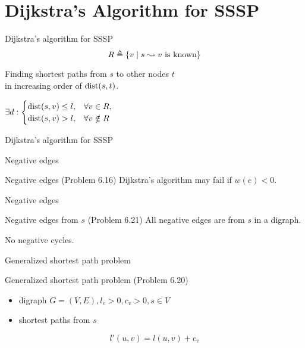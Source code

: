 \section{Dijkstra's Algorithm for SSSP}

\begin{frame}{Dijkstra's algorithm for SSSP}
  \[
	R \triangleq \{v \mid s \leadsto v \text{ is known}\}
  \]

  \vspace{0.50cm}
  \begin{center}
	Finding shortest paths from $s$ to other nodes $t$ \\
	in increasing order of $\text{dist}(s,t)$.
  \end{center}

  \begin{theorem}[Invariant]
	$\begin{displaystyle}
	  \exists d: \begin{cases}
		\dist(s,v) \le l, 	& \forall v \in R, \\
		\dist(s,v) > l, 	& \forall v \notin R
	  \end{cases}
	\end{displaystyle}$
  \end{theorem}
\end{frame}
\begin{frame}{Dijkstra's algorithm for SSSP}
\end{frame}
\begin{frame}{Negative edges}
  \begin{exampleblock}{Negative edges (Problem 6.16)}
	Dijkstra's algorithm may fail if $w(e) < 0$.
  \end{exampleblock}

\end{frame}
\begin{frame}{Negative edges}
  \begin{exampleblock}{Negative edges from $s$ (Problem 6.21)}
	All negative edges are from $s$ in a digraph.
  \end{exampleblock}

  \vspace{0.50cm}
  \centerline{No negative cycles.}
\end{frame}
\begin{frame}{Generalized shortest path problem}
  \begin{exampleblock}{Generalized shortest path problem (Problem 6.20)}
	\begin{itemize}
	  \item digraph $G = (V, E), l_e > 0, c_v > 0, s \in V$
	  \item shortest paths from $s$
	\end{itemize}
  \end{exampleblock}

  \[
	l'(u,v) = l(u,v) + c_v
  \]
\end{frame}
